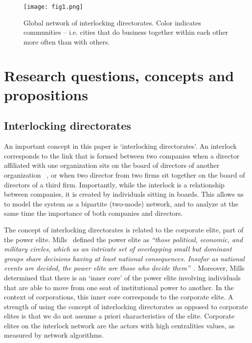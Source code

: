 \begin{figure*}
\begin{center}
\texttt{[image: fig1.png]}
\end{center}
\caption{Global network of interlocking directorates. Color indicates communities -- i.e. cities that do business together within each other more often than with others.}
\label{fig:fig1}
\end{figure*}


\section{Research questions, concepts and propositions}
\label{sec:question}
\subsection{Interlocking directorates}
An important concept in this paper is `interlocking directorates'. An interlock corresponds to the link that is formed between two companies when a director affiliated with one organization sits on the board of directors of another organization ~\citep{Mizruchi1996}, or when two director from two firms sit together on the board of directors of a third firm. Importantly, while the interlock is a relationship between companies, it is created by individuals sitting in boards. This allows us to model the system as a bipartite (two-mode) network, and to analyze at the same time the importance of both companies and directors.

The concept of interlocking directorates is related to the corporate elite, part of the power elite. Mills~\cite{mills1957} defined the power elite as \textit{``those political, economic, and military circles, which as an intricate set of overlapping small but dominant groups share decisions having at least national consequences. Insofar as national events are decided, the power elite are those who decide them''}~\citep{mills1957}. Moreover, Mills determined that there is an `inner core' of the power elite involving individuals that are able to move from one seat of institutional power to another. In the context of corporations, this inner core corresponds to the corporate elite. A strength of using the concept of interlocking directorates as opposed to corporate elites is that we do not assume a priori characteristics of the elite. Corporate elites on the interlock network are the actors with high centralities values, as measured by network algorithms.

